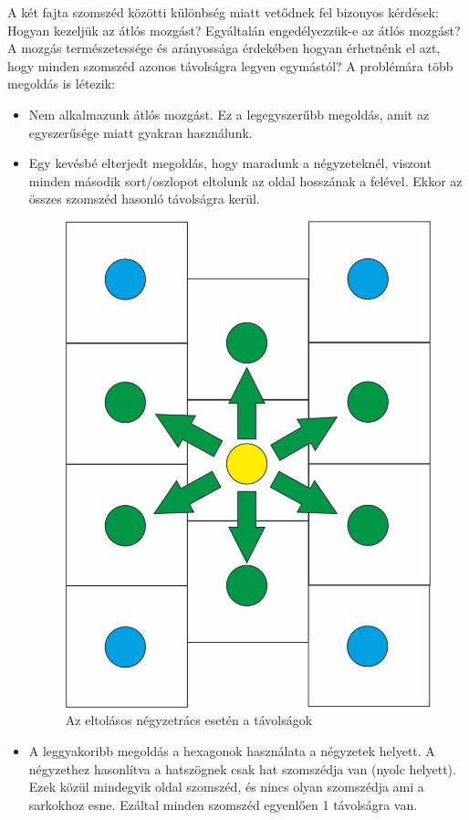 \noindent A két fajta szomszéd közötti különbség miatt vetődnek fel bizonyos kérdések: Hogyan kezeljük az átlós mozgást? Egyáltalán engedélyezzük-e az átlós mozgást? A mozgás természetessége és arányossága érdekében hogyan érhetnénk el azt, hogy minden szomszéd azonos távolságra legyen egymástól?
\newline
\newline A problémára több megoldás is létezik:

\begin{itemize}
\item Nem alkalmazunk átlós mozgást. Ez a legegyszerűbb megoldás, amit az egyszerűsége miatt gyakran használunk.
\item Egy kevésbé elterjedt megoldás, hogy maradunk a négyzeteknél, viszont minden második sort/oszlopot eltolunk az oldal hosszának a felével. Ekkor az összes szomszéd hasonló távolságra kerül.

\begin{figure}[h!]
\centering
\includegraphics[scale=0.3]{kepek/SqOffsetDistance.jpg}
\caption{Az eltolásos négyzetrács esetén a távolságok}
\label{fig:SqOffsetDistance}
\end{figure}

\item A leggyakoribb megoldás a hexagonok használata a négyzetek helyett. A négyzethez hasonlítva a hatszögnek csak hat szomszédja van (nyolc helyett). Ezek közül mindegyik oldal szomszéd, és nincs olyan szomszédja ami a sarkokhoz esne. Ezáltal minden szomszéd egyenlően 1 távolságra van.
\end{itemize}

